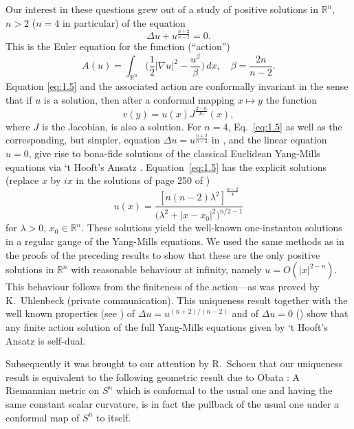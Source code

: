 \hspace{1em}Our interest in these questions grew out of a study of positive solutions
in $\mathbb{R}^n$, $n > 2$ ($n = 4$ in particular) of the equation
\begin{equation}\label{eq:1.5}
  \Delta u + u^{\frac{n+2}{n-2}} = 0.
\end{equation}
This is the Euler equation for the function (``action'')
\[A(u) = \int_{\mathbb{R}^n} \biggl(\frac{1}{2}|\nabla u|^2 - \frac{u^\beta}{\beta}\biggr)\,dx,
  \quad \beta = \frac{2n}{n-2}.\]
Equation \eqref{eq:1.5} and the associated action are conformally invariant 
in the sense that if $u$ is a solution, then after a conformal mapping $x\mapsto y$ the function
\begin{equation}
  v(y) = u(x) J^{\frac{2-n}{2n}}(x),
\end{equation}
where $J$ is the Jacobian, is also a solution. For $n=4$, Eq.~\eqref{eq:1.5}
as well as the corresponding, but simpler, equation $\Delta u = u^{\frac{n+2}{n-2}}$
in \cite{loewner_partial_1974},
and the linear equation $u = 0$, give rise to bona-fide solutions of the classical Euclidean
Yang-Mills equations via `t Hooft's Ansatz \cite{corrigan_scalar_1977,wilczek_geometry_1977}. 
Equation~\eqref{eq:1.5} has the explicit solutions (replace $x$ by $ix$ in the solutions of 
page 250 of \cite{loewner_partial_1974})
\begin{equation}\label{eq:1.7}
  u(x) = \frac{[n(n-2)\lambda^2]^{\frac{n-2}{4}}}{\bigl(\lambda^2+|x-x_0|^2\bigr)^{n/2-1}}
\end{equation}
for $\lambda>0$, $x_0\in \mathbb{R}^n$.
These solutions yield the well-known one-instanton solutions in a regular gauge of the Yang-Mills 
equations. We used the same methods as in the proofs of the preceding results to show that these
are the only positive solutions in $\mathbb{R}^n$ with reasonable behaviour at infinity,
namely $u=O(|x|^{2-n})$. This behaviour follows from the finiteness of the action---as was 
proved by K.~Uhlenbeck (private communication). This uniqueness result together with the well 
known properties (see \cite{loewner_partial_1974}) of $\Delta u = u^{(n+2)/(n-2)}$ and 
of $\Delta u = 0$ (\cite{hopf_differential_2003}) show 
that any finite action solution of the full Yang-Mills equations given by `t Hooft's Ansatz is 
self-dual.

Subsequently it was brought to our attention by R.~Schoen that our uniqueness result 
is equivalent to the following geometric result due to Obata \cite{obata_conjectures_1971}:
A Riemannian metric on $S^n$ which is conformal to the usual one and having the same constant scalar curvature,
is in fact the pullback of the usual one under a conformal map of $S^n$ to itself.

